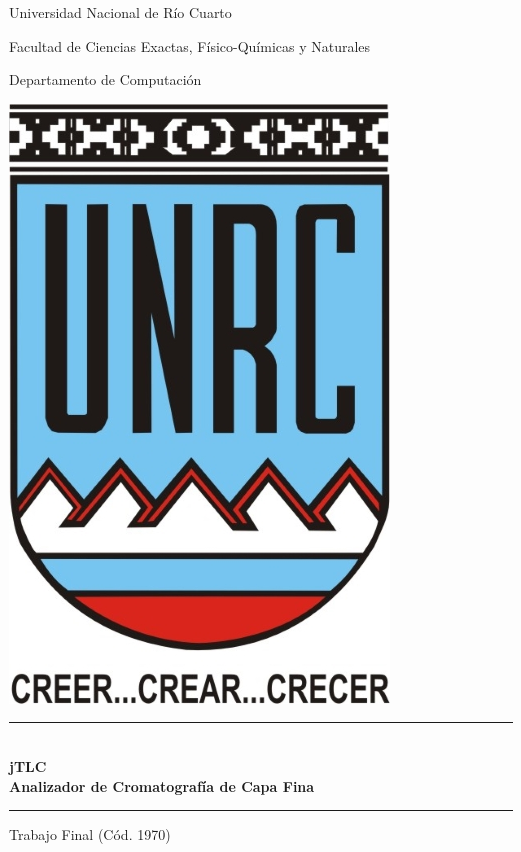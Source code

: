 \documentclass[12pt]{report}
\begin{document}
	\begin{titlepage}
		\begin{center}
			{\huge Universidad Nacional de R\'io Cuarto}\vspace{.2cm}
			
			{\large  Facultad de Ciencias Exactas, F\'isico-Qu\'imicas y Naturales}\vspace{.2cm}
			
			{\Large  Departamento de Computaci\'on}\vspace{.3cm}
			
			\includegraphics{imagenes/escudo}\vspace{.3cm}
			
			\rule{12cm}{.01cm} \vspace{0.5cm}\\
			{\LARGE \textbf{jTLC}}\\
			\vspace{0.25cm}
			{\large \textbf{Analizador de Cromatograf\'ia de Capa Fina}}
			\rule{12cm}{.01cm} \vspace{0.5cm}
			
			{\Large Trabajo Final (C\'od. 1970)
			
}
\end{center}
\end{titlepage}
\end{document}
